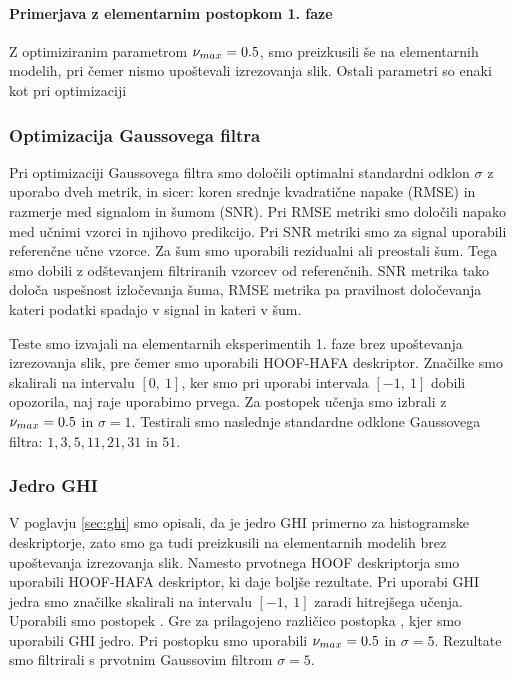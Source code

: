 \paragraph{Primerjava z elementarnim postopkom 1. faze}
Z optimiziranim parametrom $\nu_{max}=0.5$, smo \nurbf preizkusili še na elementarnih modelih, pri čemer nismo upoštevali izrezovanja slik. Ostali parametri so enaki kot pri optimizaciji



\subsubsection{Optimizacija Gaussovega filtra}
Pri optimizaciji Gaussovega filtra smo določili optimalni standardni odklon $\sigma$ z uporabo dveh metrik, in sicer: koren srednje kvadratične napake (RMSE) in razmerje med signalom in šumom (SNR). Pri RMSE metriki smo določili napako med učnimi vzorci in njihovo predikcijo. Pri SNR metriki smo za signal uporabili referenčne učne vzorce. Za šum smo uporabili rezidualni ali preostali šum. Tega smo dobili z odštevanjem filtriranih vzorcev od referenčnih. SNR metrika tako določa uspešnost izločevanja šuma, RMSE metrika pa pravilnost določevanja kateri podatki spadajo v signal in kateri v šum.

Teste smo izvajali na elementarnih eksperimentih 1. faze brez upoštevanja izrezovanja slik, pre čemer smo uporabili HOOF-HAFA deskriptor. Značilke smo skalirali na intervalu $[0,~1]$, ker smo pri uporabi intervala $[-1,~1]$ dobili opozorila, naj raje uporabimo prvega. Za postopek učenja smo izbrali \nurbf z $\nu_{max}=0.5$ in $\sigma = 1$. Testirali smo naslednje standardne odklone Gaussovega filtra: $1, 3, 5, 11, 21, 31$ in $51$. 



\subsubsection{Jedro GHI}
V poglavju \ref{sec:ghi} smo opisali, da je jedro GHI primerno za histogramske deskriptorje, zato smo ga tudi preizkusili na elementarnih modelih brez upoštevanja izrezovanja slik. Namesto prvotnega HOOF deskriptorja smo uporabili HOOF-HAFA deskriptor, ki daje boljše rezultate. Pri uporabi GHI jedra smo značilke skalirali na intervalu $[-1,~1]$ zaradi hitrejšega učenja. Uporabili smo postopek \nughi. Gre za prilagojeno različico postopka \nurbf, kjer smo uporabili GHI jedro. %
Pri postopku smo uporabili $\nu_{max}=0.5$ in $\sigma=5$. Rezultate smo filtrirali s prvotnim Gaussovim filtrom $\sigma=5$.

